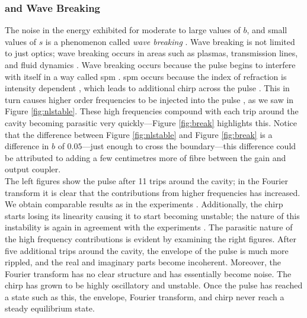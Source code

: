 \subsubsection{ and Wave Breaking}
The noise in the energy exhibited for moderate to large values of $b$, and small values of $s$ is a phenomenon called \emph{wave breaking} \cite{agrawal2013, anderson, finot, rothenberg, tomlinson}. Wave breaking is not limited to just optics; wave breaking occurs in areas such as plasmas, transmission lines, and fluid dynamics \cite{rothenberg}. Wave breaking occurs because the pulse begins to interfere with itself in a way called \gls{spm} \cite{agrawal2002, agrawal2013, becker}. \gls{spm} occurs because the index of refraction is intensity dependent \cite{agrawal2002, becker, rothenberg, silfvast}, which leads to additional chirp across the pulse \cite{agrawal2013, anderson, rothenberg, silfvast}. This in turn causes higher order frequencies to be injected into the pulse \cite{agrawal2013, anderson}, as we saw in Figure \ref{fig:nlstable}. These high frequencies compound with each trip around the cavity becoming parasitic very quickly---Figure \ref{fig:break} highlights this. Notice that the difference between Figure \ref{fig:nlstable} and Figure \ref{fig:break} is a difference in $b$ of $0.05$---just enough to cross the boundary---this difference could be attributed to adding a few centimetres more of fibre between the gain and output coupler. \\

The left figures show the pulse after 11 trips around the cavity; in the Fourier transform it is clear that the contributions from higher frequencies has increased. We obtain comparable results as in the experiments \cite{anderson, rothenberg}. Additionally, the chirp starts losing its linearity causing it to start becoming unstable; the nature of this instability is again in agreement with the experiments \cite{anderson, rothenberg}. The parasitic nature of the high frequency contributions is evident by examining the right figures. After five additional trips around the cavity, the envelope of the pulse is much more rippled, and the real and imaginary parts become incoherent. Moreover, the Fourier transform has no clear structure and has essentially become noise. The chirp has grown to be highly oscillatory and unstable. Once the pulse has reached a state such as this, the envelope, Fourier transform, and chirp never reach a steady equilibrium state.

